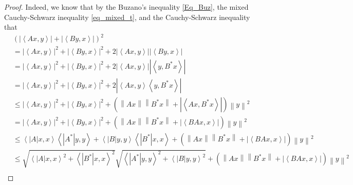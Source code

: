 \documentclass[10pt,a4paper]{amsart}
\begin{document}
\begin{proof}
Indeed, we know that by the Buzano's inequality \eqref{Eq_Buz}, the mixed Cauchy-Schwarz inequality \eqref{eq_mixed_t}, and the Cauchy-Schwarz inequality that
\begin{align}
  & {{\left( \left| \left\langle Ax,y \right\rangle  \right|+\left| \left\langle By,x \right\rangle  \right| \right)}^{2}} \nonumber\\ 
 & ={{\left| \left\langle Ax,y \right\rangle  \right|}^{2}}+{{\left| \left\langle By,x \right\rangle  \right|}^{2}}+2\left| \left\langle Ax,y \right\rangle  \right|\left| \left\langle By,x \right\rangle  \right| \nonumber\\ 
 & ={{\left| \left\langle Ax,y \right\rangle  \right|}^{2}}+{{\left| \left\langle By,x \right\rangle  \right|}^{2}}+2\left| \left\langle Ax,y \right\rangle  \right|\left| \left\langle y,{{B}^{*}}x \right\rangle  \right| \nonumber\\ 
 & ={{\left| \left\langle Ax,y \right\rangle  \right|}^{2}}+{{\left| \left\langle By,x \right\rangle  \right|}^{2}}+2\left| \left\langle Ax,y \right\rangle \left\langle y,{{B}^{*}}x \right\rangle  \right| \nonumber\\ 
 & \le {{\left| \left\langle Ax,y \right\rangle  \right|}^{2}}+{{\left| \left\langle By,x \right\rangle  \right|}^{2}}+\left( \left\| Ax \right\|\left\| {{B}^{*}}x \right\|+\left| \left\langle Ax,{{B}^{*}}x \right\rangle  \right| \right){{\left\| y \right\|}^{2}} \nonumber\\ 
 & ={{\left| \left\langle Ax,y \right\rangle  \right|}^{2}}+{{\left| \left\langle By,x \right\rangle  \right|}^{2}}+\left( \left\| Ax \right\|\left\| {{B}^{*}}x \right\|+\left| \left\langle BAx,x \right\rangle  \right| \right){{\left\| y \right\|}^{2}} \nonumber\\ 
 & \le \left\langle \left| A \right|x,x \right\rangle \left\langle \left| {{A}^{*}} \right|y,y \right\rangle +\left\langle \left| B \right|y,y \right\rangle \left\langle \left| {{B}^{*}} \right|x,x \right\rangle +\left( \left\| Ax \right\|\left\| {{B}^{*}}x \right\|+\left| \left\langle BAx,x \right\rangle  \right| \right){{\left\| y \right\|}^{2}} \nonumber\\ 
 & \le \sqrt{{{\left\langle \left| A \right|x,x \right\rangle }^{2}}+{{\left\langle \left| {{B}^{*}} \right|x,x \right\rangle }^{2}}}\sqrt{{{\left\langle \left| {{A}^{*}} \right|y,y \right\rangle }^{2}}+{{\left\langle \left| B \right|y,y \right\rangle }^{2}}}+\left( \left\| Ax \right\|\left\| {{B}^{*}}x \right\|+\left| \left\langle BAx,x \right\rangle  \right| \right){{\left\| y \right\|}^{2}} \nonumber\\ 

\end{align}
\end{proof}
\end{document}

